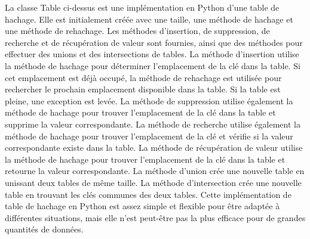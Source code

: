 \documentclass[12pt]{article}
\begin{document}
    La classe Table ci-dessus est une implémentation en Python d'une table de hachage.
    Elle est initialement créée avec une taille, une méthode de hachage et une méthode de rehachage.
    Les méthodes d'insertion, de suppression, de recherche et de récupération de valeur sont fournies, ainsi que des méthodes pour effectuer des unions et des intersections de tables.
    La méthode d'insertion utilise la méthode de hachage pour déterminer l'emplacement de la clé dans la table.
    Si cet emplacement est déjà occupé, la méthode de rehachage est utilisée pour rechercher le prochain emplacement disponible dans la table.
    Si la table est pleine, une exception est levée.
    La méthode de suppression utilise également la méthode de hachage pour trouver l'emplacement de la clé dans la table et supprime la valeur correspondante.
    La méthode de recherche utilise également la méthode de hachage pour trouver l'emplacement de la clé et vérifie si la valeur correspondante existe dans la table.
    La méthode de récupération de valeur utilise la méthode de hachage pour trouver l'emplacement de la clé dans la table et retourne la valeur correspondante.
    La méthode d'union crée une nouvelle table en unissant deux tables de même taille.
    La méthode d'intersection crée une nouvelle table en trouvant les clés communes des deux tables.
    Cette implémentation de table de hachage en Python est assez simple et flexible pour être adaptée à différentes situations, mais elle n'est peut-être pas la plus efficace pour de grandes quantités de données.
\end{document}
